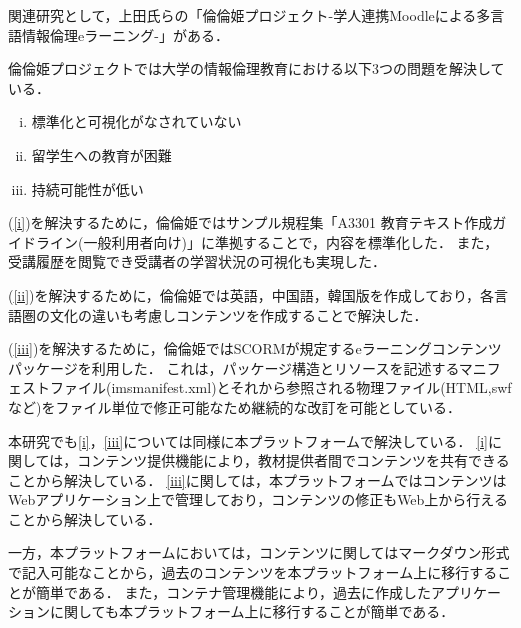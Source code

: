 関連研究として，上田氏らの「倫倫姫プロジェクト-学人連携Moodleによる多言語情報倫理eラーニング-」\cite{rinri}がある．

倫倫姫プロジェクトでは大学の情報倫理教育における以下3つの問題を解決している．

\begin{enumerate}[(i)]
    \item 標準化と可視化がなされていない \label{i}
    \item 留学生への教育が困難 \label{ii}
    \item 持続可能性が低い \label{iii}
\end{enumerate}

(\ref{i})を解決するために，倫倫姫ではサンプル規程集「A3301 教育テキスト作成ガイドライン(一般利用者向け)」に準拠することで，内容を標準化した．
また，受講履歴を閲覧でき受講者の学習状況の可視化も実現した．

(\ref{ii})を解決するために，倫倫姫では英語，中国語，韓国版を作成しており，各言語圏の文化の違いも考慮しコンテンツを作成することで解決した．

(\ref{iii})を解決するために，倫倫姫ではSCORMが規定するeラーニングコンテンツパッケージを利用した．
これは，パッケージ構造とリソースを記述するマニフェストファイル(imsmanifest.xml)とそれから参照される物理ファイル(HTML,swfなど)をファイル単位で修正可能なため継続的な改訂を可能としている．

本研究でも\ref{i}，\ref{iii}については同様に本プラットフォームで解決している．
\ref{i}に関しては，コンテンツ提供機能により，教材提供者間でコンテンツを共有できることから解決している．
\ref{iii}に関しては，本プラットフォームではコンテンツはWebアプリケーション上で管理しており，コンテンツの修正もWeb上から行えることから解決している．

一方，本プラットフォームにおいては，コンテンツに関してはマークダウン形式で記入可能なことから，過去のコンテンツを本プラットフォーム上に移行することが簡単である．
また，コンテナ管理機能により，過去に作成したアプリケーションに関しても本プラットフォーム上に移行することが簡単である．

